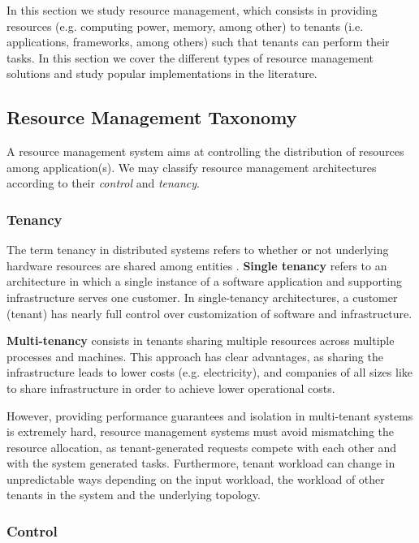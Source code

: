 
In this section we study resource management, which consists in providing resources (e.g. computing power, memory, among other) to tenants (i.e. applications, frameworks, among others) such that tenants can perform their tasks. In this section we cover the different types of resource management solutions and study popular implementations in the literature.

\subsection{Resource Management Taxonomy}

A resource management system aims at controlling the distribution of resources among application(s). We may classify resource management architectures according to their \textit{control} and \textit{tenancy}. 

\subsubsection{Tenancy}

The term tenancy in distributed systems refers to whether or not underlying hardware resources are shared among entities \cite{Hong2019}. \textbf{Single tenancy} refers to an architecture in which a single instance of a software application and supporting infrastructure serves one customer. In single-tenancy architectures, a customer (tenant) has nearly full control over customization of software and infrastructure. 

\textbf{Multi-tenancy} consists in tenants sharing multiple resources across multiple processes and machines. This approach has clear advantages, as sharing the infrastructure leads to lower costs (e.g. electricity), and companies of all sizes like to share infrastructure in order to achieve lower operational costs. 

However, providing performance guarantees and isolation in multi-tenant systems is extremely hard, resource management systems must avoid mismatching the resource allocation, as tenant-generated requests compete with each other and with the system generated tasks. Furthermore, tenant workload can change in unpredictable ways depending on the input workload, the workload of other tenants in the system and the underlying topology. 

\subsubsection{Control}

